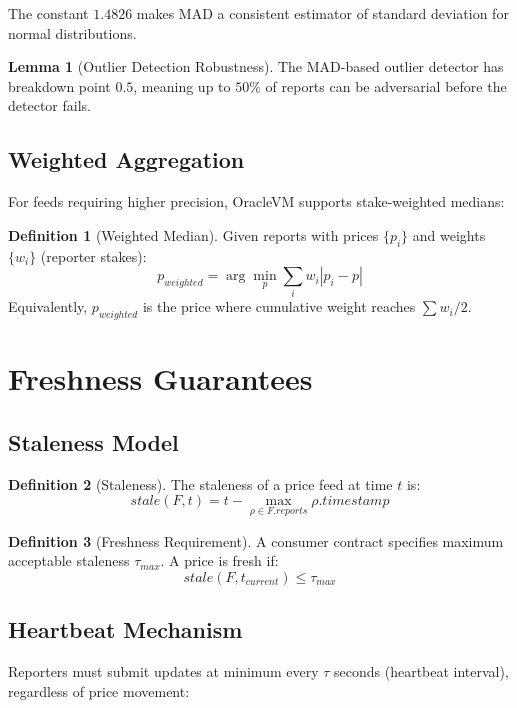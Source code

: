 \documentclass[11pt,a4paper]{article}
\theoremstyle{definition}
\newtheorem{definition}{Definition}
\newtheorem{lemma}{Lemma}
\begin{document}
The constant $1.4826$ makes MAD a consistent estimator of standard deviation for normal distributions.

\begin{lemma}[Outlier Detection Robustness]
The MAD-based outlier detector has breakdown point $0.5$, meaning up to $50\%$ of reports can be adversarial before the detector fails.
\end{lemma}

\subsection{Weighted Aggregation}

For feeds requiring higher precision, OracleVM supports stake-weighted medians:

\begin{definition}[Weighted Median]
Given reports with prices $\{p_i\}$ and weights $\{w_i\}$ (reporter stakes):
\[
p_{weighted} = \arg\min_p \sum_i w_i |p_i - p|
\]
Equivalently, $p_{weighted}$ is the price where cumulative weight reaches $\sum w_i / 2$.
\end{definition}

\section{Freshness Guarantees}

\subsection{Staleness Model}

\begin{definition}[Staleness]
The staleness of a price feed at time $t$ is:
\[
stale(F, t) = t - \max_{\rho \in F.reports} \rho.timestamp
\]
\end{definition}

\begin{definition}[Freshness Requirement]
A consumer contract specifies maximum acceptable staleness $\tau_{max}$. A price is fresh if:
\[
stale(F, t_{current}) \leq \tau_{max}
\]
\end{definition}

\subsection{Heartbeat Mechanism}

Reporters must submit updates at minimum every $\tau$ seconds (heartbeat interval), regardless of price movement:
\end{document}
